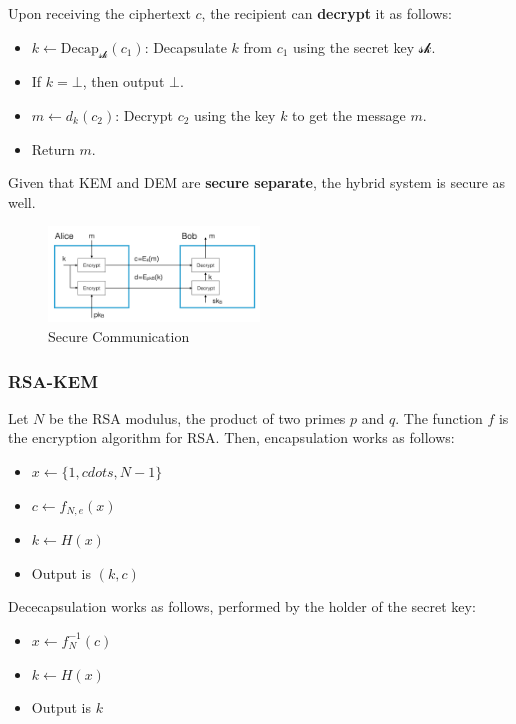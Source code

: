 Upon receiving the ciphertext \( c \), the recipient can \textbf{decrypt} it as follows:

\begin{itemize}
    \item \( k \leftarrow \text{Decap}_{\mathcal{sk}}(c_1) \): Decapsulate \( k \) from \( c_1 \) using the secret key \( \mathcal{sk} \).
    \item If \( k = \bot \), then output \( \bot \).
    \item \( m \leftarrow d_k(c_2) \): Decrypt \( c_2 \) using the key \( k \) to get the message \( m \).
    \item Return \( m \).
\end{itemize}

Given that KEM and DEM are \textbf{secure separate}, the hybrid system is secure as well.

\begin{figure}[h!]
    \centering
    \includegraphics[width=0.5\textwidth]{img/securecom.png}
    \caption{Secure Communication}
\end{figure}

\subsubsection{RSA-KEM}
Let $N$ be the RSA modulus, the product of two primes $p$ and $q$.
The function $f$ is the encryption algorithm for RSA.
Then, encapsulation works as follows:

\begin{itemize}
    \item $x \leftarrow \{1, cdots, N-1 \}$
    \item $c \leftarrow f_{N,e}(x)$
    \item $k \leftarrow H(x)$
    \item Output is $(k,c)$
\end{itemize}

Dececapsulation works as follows, performed by the holder of the secret key:

\begin{itemize}
    \item $x \leftarrow f_{N}^{-1}(c)$
    \item $k \leftarrow H(x)$
    \item Output is $k$
\end{itemize}

